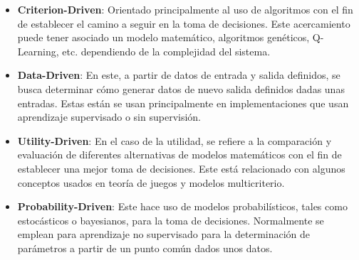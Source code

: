 \begin{itemize}
    \item \textbf{Criterion-Driven}: Orientado principalmente al uso de algoritmos con el fin de establecer el camino a seguir en la toma de decisiones. Este acercamiento puede tener asociado un modelo matemático, algoritmos genéticos, Q-Learning, etc. dependiendo de la complejidad del sistema.
    \item \textbf{Data-Driven}: En este, a partir de datos de entrada y salida definidos, se busca determinar cómo generar datos de nuevo salida definidos dadas unas entradas. Estas están se usan principalmente en implementaciones que usan aprendizaje supervisado o sin supervisión. 
    \item \textbf{Utility-Driven}: En el caso de la utilidad, se refiere a la comparación y evaluación de diferentes alternativas de modelos matemáticos con el fin de establecer una mejor toma de decisiones. Este está relacionado con algunos conceptos usados en teoría de juegos y modelos multicriterio.
    \item \textbf{Probability-Driven}: Este hace uso de modelos probabilísticos, tales como estocásticos o bayesianos, para la toma de decisiones. Normalmente se emplean para aprendizaje no supervisado para la determinación de parámetros a partir de un punto común dados unos datos.
\end{itemize}
